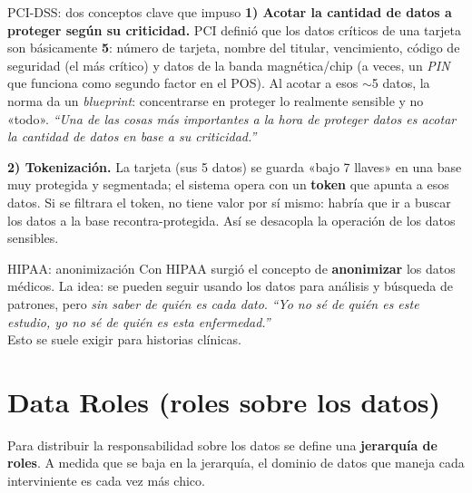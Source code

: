 \documentclass[11pt,a4paper]{article}
\newcommand{\prof}[1]{%
  \medskip\noindent\hspace*{1em}\textit{``#1''}\\[-1pt]%
  \hspace*{1em}{\footnotesize\textcolor{black!55}{--- Prof.\ Leandro Suárez (clase teórica)}}\medskip}
\begin{document}
\begin{notebox}{PCI-DSS: dos conceptos clave que impuso}
\textbf{1) Acotar la cantidad de datos a proteger según su criticidad.} PCI definió que los
datos críticos de una tarjeta son básicamente \textbf{5}: número de tarjeta, nombre del
titular, vencimiento, código de seguridad (el más crítico) y datos de la banda magnética/chip
(a veces, un \emph{PIN} que funciona como segundo factor en el POS). Al acotar a esos
\(\sim\)5 datos, la norma da un \emph{blueprint}: concentrarse en proteger lo realmente
sensible y no «todo».
\prof{Una de las cosas más importantes a la hora de proteger datos es acotar la cantidad de
datos en base a su criticidad.}

\medskip
\textbf{2) Tokenización.} La tarjeta (sus 5 datos) se guarda «bajo 7 llaves» en una base muy
protegida y segmentada; el sistema opera con un \textbf{token} que apunta a esos datos. Si se
filtrara el token, no tiene valor por sí mismo: habría que ir a buscar los datos a la base
recontra-protegida. Así se desacopla la operación de los datos sensibles.
\end{notebox}

\begin{notebox}{HIPAA: anonimización}
Con HIPAA surgió el concepto de \textbf{anonimizar} los datos médicos. La idea: se pueden
seguir usando los datos para análisis y búsqueda de patrones, pero \emph{sin saber de quién
es cada dato}. \prof{Yo no sé de quién es este estudio, yo no sé de quién es esta enfermedad.}
Esto se suele exigir para historias clínicas.
\end{notebox}

\section{Data Roles (roles sobre los datos)}

Para distribuir la responsabilidad sobre los datos se define una \textbf{jerarquía de roles}.
A medida que se baja en la jerarquía, el dominio de datos que maneja cada interviniente es
cada vez más chico.
\end{document}
